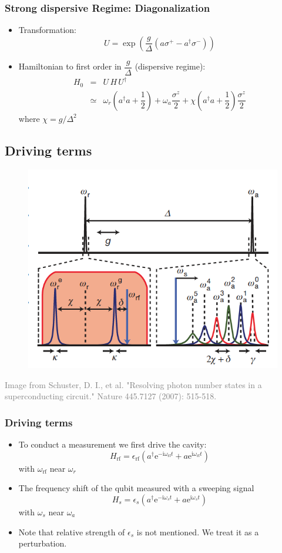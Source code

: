 \documentclass[xcolor=dvipsnames,hyperref={CJKbookmarks=true}]{beamer}
\newcommand\mi{\mathrm{i}}
\newcommand\e{\mathrm{e}}
\newcommand{\rf}{\text{rf}}
\begin{document}
\begin{frame}
\frametitle{Strong dispersive Regime: Diagonalization}
\begin{itemize}
\item Transformation: 
$$U=\exp{\left(\dfrac{g}{\Delta}\left(a\sigma^{+}-a^{\dagger}\sigma^{-} \right)\right)}$$
\item Hamiltonian to first order in $\dfrac{g}{\Delta}$ (dispersive regime):
\begin{eqnarray*}
H_0 &=& U\,H\,U^{\dagger}\\
&\simeq &  \omega_r \left(a^{\dagger} a+ \dfrac{1}{2} \right) +  \omega_a \dfrac{\sigma^{z}}{2}+ \chi \left(a^{\dagger}a+\dfrac{1}{2} \right)\dfrac{\sigma^{z}}{2}
\end{eqnarray*}
where $\chi = g/\Delta ^2$
\end{itemize}
\end{frame}

\subsection{Driving terms}
\begin{frame}
\begin{figure}
\centering
\includegraphics[width=0.7\linewidth]{TransitionLines}
\end{figure}
\tiny{\textcolor{gray}{Image from Schuster, D. I., et al. "Resolving photon number states in a superconducting circuit." Nature 445.7127 (2007): 515-518.\cite{schuster2007resolving}}}
\end{frame}

\begin{frame}
\frametitle{Driving terms}
\begin{itemize}
\item To conduct a measurement we first drive the cavity:
    $$
      H_{\rf} = \epsilon_{\rf}\left(a^{\dagger}\e^{-\mi\omega_{\rf}t}
      +a\e^{\mi\omega_{\rf}t} \right)
    $$
with $\omega_{\rf}$ near $\omega_r$
\item The frequency shift of the qubit measured with a sweeping signal
    $$
      H_{s} = \epsilon_{s}\left(a^{\dagger}\e^{-\mi\omega_{s}t}
      +a\e^{\mi\omega_{s}t} \right)
    $$
with $\omega_{s}$ near $\omega_a$
\item Note that relative strength of $\epsilon_s$ is not mentioned. We treat it 
as a perturbation. 
\end{itemize}
\end{frame}
\end{document}
